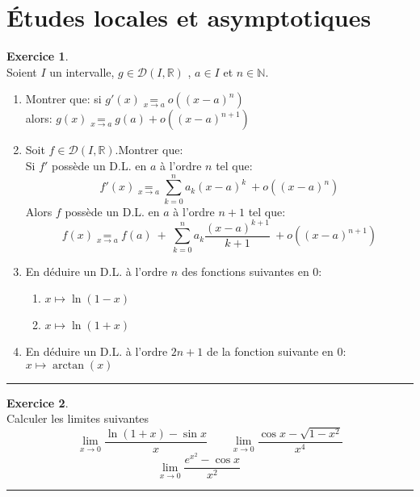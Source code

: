 \documentclass[a4paper,10pt]{article}
\theoremstyle{definition}
\theoremstyle{definition}
\newtheorem{exo}{Exercice}
\newcommand{\R}{\mathbb{R}}
\newcommand{\N}{\mathbb{N}}
\begin{document}
\section*{Études locales et asymptotiques}
\begin{minipage}{1\linewidth}
\begin{minipage}[t]{0.48\linewidth}
\raggedright



\begin{exo}\quad\\
Soient $I$ un intervalle, $g \in\mathcal{D}(I ,\R)$ , $a \in I$  et
$n \in\N$.\\
\begin{enumerate}
	\item  Montrer que: si $g'(x)\underset{x\rightarrow a}{=} o\left((x-a)^n\right)$\\ alors: $g(x)\underset{x\rightarrow a}{=} g(a) + o\left((x-a)^{n+1}\right)$
	\item Soit $f \in\mathcal{D}(I ,\R)$.Montrer que:\\Si $f'$ possède
	un D.L. en $a$ à l'ordre $n$ tel que:
	$$f'(x) \underset{x\rightarrow a}{=} \sum\limits_{k=0}^{n}a_k(x-a)^k \ + o\left((x-a)^n\right)$$
	Alors $f$ possède
	un D.L. en $a$ à l'ordre $n+1$ tel que:
	$$f(x) \underset{x\rightarrow a}{=} f(a) \ + \  \sum\limits_{k=0}^{n}a_k\dfrac{(x-a)^{k+1} }{k+1}\ + o\left((x-a)^{n+1}\right)$$
	\item En déduire un D.L. à l'ordre $n$ des fonctions suivantes en $0$:
	\begin{enumerate}[$\square$]
		\item $ x \longmapsto \ln(1-x)$
		\item $ x \longmapsto \ln(1+x)$
	\end{enumerate}
\item En déduire un D.L. à l'ordre $2n+1$ de la fonction suivante en $0$:
$ x \longmapsto \arctan(x)$
\end{enumerate}

\centering
\rule{1\linewidth}{0.6pt}
\end{exo}

\begin{exo}\quad\\
	Calculer les limites suivantes
	$$\lim_{x\rightarrow 0}\frac{\ln (1+x)-\sin x}{x}
	\quad\quad \lim_{x\rightarrow 0}\frac{\cos x-\sqrt{1-x^2}}{x^4}$$
	$$\lim_{x\rightarrow 0}\frac{e^{x^2}-\cos x}{x^2}
	\quad\quad$$ 
	\centering\rule{1\linewidth}{0.6pt}
\end{exo}



\end{minipage}
\end{minipage}
\end{document}

